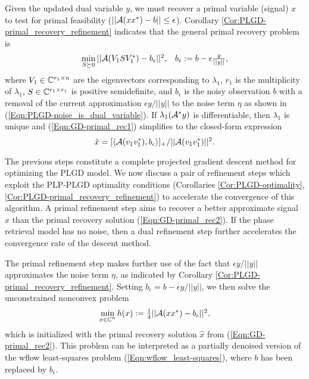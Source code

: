 Given the updated dual variable $y$, we must recover a primal variable (signal) $x$ to test for primal feasibility ($|| {\mathcal A} (xx^*) - b || \leq \epsilon$).  Corollary \ref{Cor:PLGD-primal_recovery_refinement} indicates that the general primal recovery problem is
\begin{equation} 	\label{Eqn:GD-primal_rec1}
\begin{array}{lr}
\min\limits_{\substack{S \succeq 0}}	|| {\mathcal A}(V_1 S V_1^*) - b_\epsilon ||^2,
	& 	b_\epsilon := b - \epsilon \frac{y}{||y||},
\end{array}
\end{equation}
where $V_1 \in {\mathbb C}^{r_1 \times n}$ are the eigenvectors corresponding to $\lambda_1$, $r_1$ is the multiplicity of $\lambda_1$, $S \in {\mathbb C}^{r_1 \times r_1}$ is positive semidefinite, and $b_\epsilon$ is the noisy observation $b$ with a removal of the current approximation $\epsilon y / ||y||$ to the noise term $\eta$ as shown in (\ref{Eqn:PLGD-noise_is_dual_variable}).  If $ \lambda_1({\mathcal A}^* y)$ is differentiable, then $\lambda_1$ is unique and (\ref{Eqn:GD-primal_rec1}) simplifies to the closed-form expression
\begin{equation} 	\label{Eqn:GD-primal_rec2}
\hat{x} = [ \langle {\mathcal A}(v_1v_1^*), b_\epsilon \rangle ]_+ / || {\mathcal A}(v_1v_1^*)||^2.
\end{equation}






The previous steps constitute a complete projected gradient descent method for optimizing the PLGD model.  We now discuss a pair of refinement steps which exploit the PLP-PLGD optimality conditions (Corollaries \ref{Cor:PLGD-optimality}, \ref{Cor:PLGD-primal_recovery_refinement}) to accelerate the convergence of this algorithm.  A primal refinement step aims to recover a better approximate signal $x$ than the primal recovery solution (\ref{Eqn:GD-primal_rec2}).  If the phase retrieval model has no noise, then a dual refinement step further accelerates the convergence rate of the descent method.  





The primal refinement step makes further use of the fact that $\epsilon y / ||y||$ approximates the noise term $\eta$, as indicated by Corollary \ref{Cor:PLGD-primal_recovery_refinement}.  Setting $b_\epsilon = b - \epsilon y / ||y||$, we then solve the unconstrained nonconvex problem
\begin{equation}	\label{Eqn:GD-PFD}
\begin{array}{l}
\min\limits_{\substack{x \in {\mathbb C}^n}} h(x) := \frac{1}{4}|| {\mathcal A}(x x^*) - b_\epsilon
||^2,
\end{array}
\end{equation}
which is initialized with the primal recovery solution $\hat{x}$ from (\ref{Eqn:GD-primal_rec2}).  This problem can be interpreted as a partially denoised version of the wflow least-squares problem (\ref{Eqn:wflow_least-squares}), where $b$ has been replaced by $b_\epsilon$.




